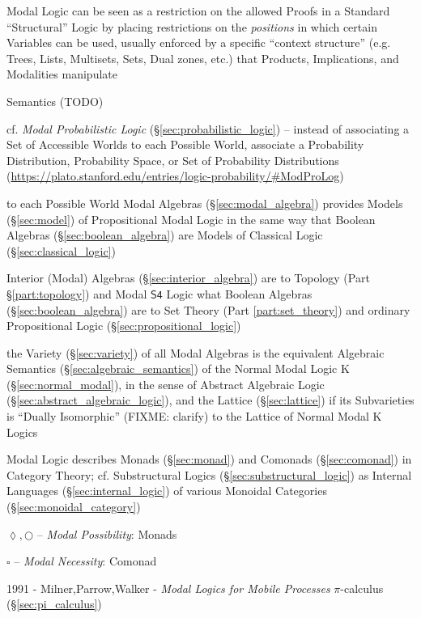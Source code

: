 Modal Logic can be seen as a restriction on the allowed Proofs in a
Standard ``Structural'' Logic by placing restrictions on the
\emph{positions} in which certain Variables can be used, usually
enforced by a specific ``context structure'' (e.g. Trees, Lists,
Multisets, Sets, Dual zones, etc.) that Products, Implications, and
Modalities manipulate

Semantics (TODO)

\fist cf. \emph{Modal Probabilistic Logic} (\S\ref{sec:probabilistic_logic}) --
instead of associating a Set of Accessible Worlds to each Possible World,
associate a Probability Distribution, Probability Space, or Set of Probability
Distributions
(\url{https://plato.stanford.edu/entries/logic-probability/#ModProLog})

to each Possible World Modal Algebras (\S\ref{sec:modal_algebra}) provides
Models (\S\ref{sec:model}) of Propositional Modal Logic in the same way that
Boolean Algebras (\S\ref{sec:boolean_algebra}) are Models of Classical Logic
(\S\ref{sec:classical_logic})

Interior (Modal) Algebras (\S\ref{sec:interior_algebra}) are to Topology (Part
\S\ref{part:topology}) and Modal $\mathsf{S4}$ Logic what Boolean Algebras
(\S\ref{sec:boolean_algebra}) are to Set Theory (Part \ref{part:set_theory}) and
ordinary Propositional Logic (\S\ref{sec:propositional_logic})

the Variety (\S\ref{sec:variety}) of all Modal Algebras is the equivalent
Algebraic Semantics (\S\ref{sec:algebraic_semantics}) of the Normal Modal Logic
$\mathrm{K}$ (\S\ref{sec:normal_modal}), in the sense of Abstract Algebraic
Logic (\S\ref{sec:abstract_algebraic_logic}), and the Lattice
(\S\ref{sec:lattice}) if its Subvarieties is ``Dually Isomorphic'' (FIXME:
clarify) to the Lattice of Normal Modal $\mathrm{K}$ Logics

Modal Logic describes Monads (\S\ref{sec:monad}) and Comonads
(\S\ref{sec:comonad}) in Category Theory; cf. Substructural Logics
(\S\ref{sec:substructural_logic}) as Internal Languages
(\S\ref{sec:internal_logic}) of various Monoidal Categories
(\S\ref{sec:monoidal_category})

$\lozenge, \bigcirc$ -- \emph{Modal Possibility}: Monads

$\square$ -- \emph{Modal Necessity}: Comonad

1991 - Milner,Parrow,Walker - \emph{Modal Logics for Mobile Processes} \fist
$\pi$-calculus (\S\ref{sec:pi_calculus})

\asterism

